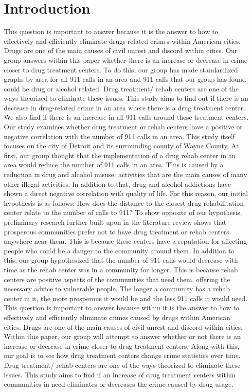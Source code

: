 \documentclass[12pt]{article}
\begin{document}
\section{Introduction} \label{sec:introduction}
    This question is important to answer because it is the answer to how to effectively and efficiently eliminate drugs-related crimes within American cities. Drugs are one of the main causes of civil unrest and discord within cities. Our group answers within this paper whether there is an increase or decrease in crime closer to drug treatment centers. To do this, our group has made standardized graphs by area for all 911 calls in an area and 911 calls that our group has found could be drug or alcohol related. Drug treatment/ rehab centers are one of the ways theorized to eliminate these issues. This study aims to find out if there is an decrease in drug-related crime in an area where there is a drug treatment center. We also find if there is an increase in all 911 calls around these treatment centers.
    Our study examines whether drug treatment or rehab centers have a positive or negative correlation with the number of 911 calls in an area. This study itself focuses on the city of Detroit and its surrounding county of Wayne County. At first, our group thought that the implementation of a drug rehab center in an area would reduce the number of 911 calls in an area. This is caused by a reduction in drug and alcohol misuse; activities that are the main causes of many other illegal activities. In addition to that, drug and alcohol addictions have shown a direct negative correlation with quality of life. For this reason, our initial hypothesis is as follows: How does the distance to the closest drug rehabilitation center relate to the number of calls to 911? To show opposite of our hypothesis, preliminary research further built upon in the literature review shows that prosperous communities prefer not to have drug treatment or rehab centers anywhere near them. This is because these centers have a reputation for affecting people who could be a danger to the community around them. In addition to this, our group hypothesized that the number of 911 calls would decrease with time as the rehab center was in a community for longer. This is because rehab centers are positive aspects of the communities that need them, offering the necessary advice to vulnerable people. The longer a community has a rehab center in it, the more prosperous it would be and the less 911 calls it would need. 
   This question is important to answer because within it is the answer to how to effectively and efficiently eliminate crimes caused by drugs within American cities. Drugs are one of the main causes of civil unrest and discord within cities. Within this paper, our group will attempt to answer whether or not there is an increase or decrease in crime closer to drug treatment centers. Along with this, our goal is to see how drug treatment centers change crime statistics over time. Drug treatment/ rehab centers are one of the ways theorized to eliminate these issues. This study aims to find if an increase of drug treatment centers within communities in need eliminates or decreases the crime caused by drug usage.
\end{document}
